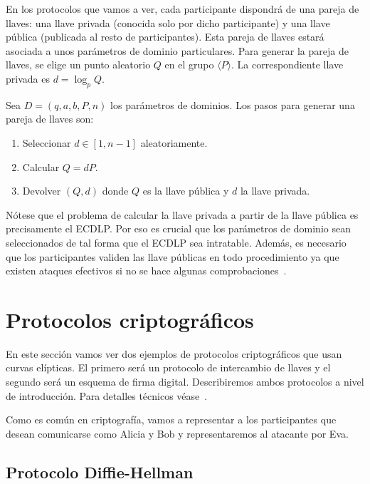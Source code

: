 En los protocolos que vamos a ver, cada participante dispondrá de una pareja de llaves: una llave privada (conocida solo por dicho participante) y una llave pública (publicada al resto de participantes). Esta pareja de llaves estará asociada a unos parámetros de dominio particulares. Para generar la pareja de llaves, se elige un punto aleatorio $Q$ en el grupo $\langle P \rangle$. La correspondiente llave privada es $d = \log_p Q$.

\begin{algoritmo}\label{alg:pareja de llaves}
    Sea $D = (q, a, b, P, n)$ los parámetros de dominios. Los pasos para generar una pareja de llaves son:
    \begin{enumerate}
        \item Seleccionar $d \in [1, n -1]$ aleatoriamente.
        \item Calcular $Q = d P$.
        \item Devolver $(Q, d)$ donde $Q$ es la llave pública y $d$ la llave privada.
    \end{enumerate}
\end{algoritmo}

Nótese que el problema de calcular la llave privada a partir de la llave pública es precisamente el ECDLP. Por eso es crucial que los parámetros de dominio sean seleccionados de tal forma que el ECDLP sea intratable. Además, es necesario que los participantes validen las llave públicas en todo procedimiento ya que existen ataques efectivos si no se hace algunas comprobaciones~\cite[cap. 4]{Hankerson:2003}.

\section{Protocolos criptográficos}
\label{sec:Protocolos criptográficos}

En este sección vamos ver dos ejemplos de protocolos criptográficos que usan curvas elípticas. El primero será un protocolo de intercambio de llaves y el segundo será un esquema de firma digital. Describiremos ambos protocolos a nivel de introducción. Para detalles técnicos véase~\cite[cap. 4]{Hankerson:2003}.

Como es común en criptografía, vamos a representar a los participantes que desean comunicarse como Alicia y Bob y representaremos al atacante por Eva.

\subsection{Protocolo Diffie-Hellman}
\label{sub:Protocolo Diffie-Hellman}

